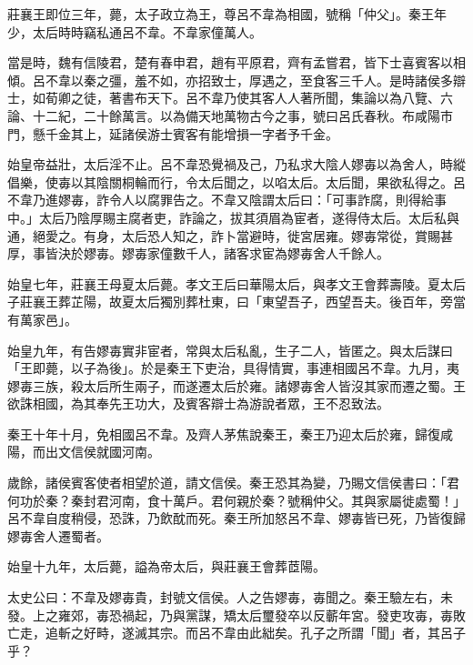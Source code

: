 \begin{pinyinscope}
莊襄王即位三年，薨，太子政立為王，尊呂不韋為相國，號稱「仲父」。秦王年少，太后時時竊私通呂不韋。不韋家僮萬人。

當是時，魏有信陵君，楚有春申君，趙有平原君，齊有孟嘗君，皆下士喜賓客以相傾。呂不韋以秦之彊，羞不如，亦招致士，厚遇之，至食客三千人。是時諸侯多辯士，如荀卿之徒，著書布天下。呂不韋乃使其客人人著所聞，集論以為八覽、六論、十二紀，二十餘萬言。以為備天地萬物古今之事，號曰呂氏春秋。布咸陽市門，懸千金其上，延諸侯游士賓客有能增損一字者予千金。

始皇帝益壯，太后淫不止。呂不韋恐覺禍及己，乃私求大陰人嫪毐以為舍人，時縱倡樂，使毐以其陰關桐輪而行，令太后聞之，以啗太后。太后聞，果欲私得之。呂不韋乃進嫪毐，詐令人以腐罪告之。不韋又陰謂太后曰：「可事詐腐，則得給事中。」太后乃陰厚賜主腐者吏，詐論之，拔其須眉為宦者，遂得侍太后。太后私與通，絕愛之。有身，太后恐人知之，詐卜當避時，徙宮居雍。嫪毐常從，賞賜甚厚，事皆決於嫪毐。嫪毐家僮數千人，諸客求宦為嫪毐舍人千餘人。

始皇七年，莊襄王母夏太后薨。孝文王后曰華陽太后，與孝文王會葬壽陵。夏太后子莊襄王葬芷陽，故夏太后獨別葬杜東，曰「東望吾子，西望吾夫。後百年，旁當有萬家邑」。

始皇九年，有告嫪毐實非宦者，常與太后私亂，生子二人，皆匿之。與太后謀曰「王即薨，以子為後」。於是秦王下吏治，具得情實，事連相國呂不韋。九月，夷嫪毐三族，殺太后所生兩子，而遂遷太后於雍。諸嫪毐舍人皆沒其家而遷之蜀。王欲誅相國，為其奉先王功大，及賓客辯士為游說者眾，王不忍致法。

秦王十年十月，免相國呂不韋。及齊人茅焦說秦王，秦王乃迎太后於雍，歸復咸陽，而出文信侯就國河南。

歲餘，諸侯賓客使者相望於道，請文信侯。秦王恐其為變，乃賜文信侯書曰：「君何功於秦？秦封君河南，食十萬戶。君何親於秦？號稱仲父。其與家屬徙處蜀！」呂不韋自度稍侵，恐誅，乃飲酖而死。秦王所加怒呂不韋、嫪毐皆已死，乃皆復歸嫪毐舍人遷蜀者。

始皇十九年，太后薨，謚為帝太后，與莊襄王會葬茝陽。

太史公曰：不韋及嫪毐貴，封號文信侯。人之告嫪毐，毐聞之。秦王驗左右，未發。上之雍郊，毐恐禍起，乃與黨謀，矯太后璽發卒以反蘄年宮。發吏攻毐，毐敗亡走，追斬之好畤，遂滅其宗。而呂不韋由此絀矣。孔子之所謂「聞」者，其呂子乎？


\end{pinyinscope}